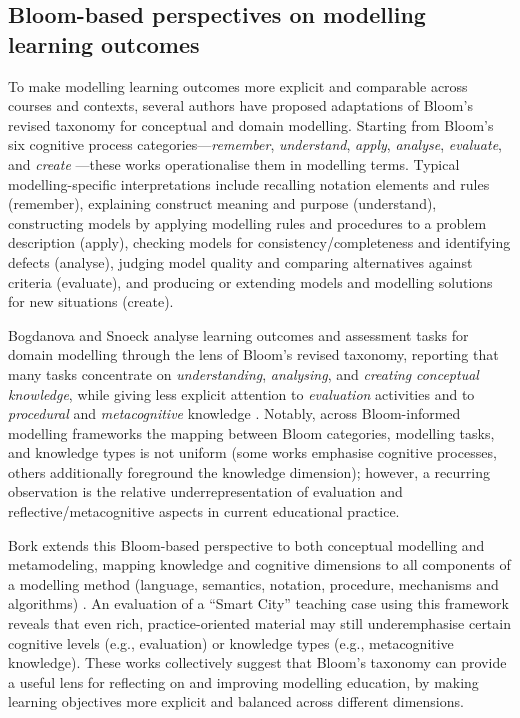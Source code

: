 \subsection{Bloom-based perspectives on modelling learning outcomes}
\label{subsec:bloom_perspectives_modelling_learning_outcomes}

To make modelling learning outcomes more explicit and comparable across courses and contexts, several authors have proposed adaptations of Bloom's revised taxonomy for conceptual and domain modelling. Starting from Bloom’s six cognitive process categories---\emph{remember}, \emph{understand}, \emph{apply}, \emph{analyse}, \emph{evaluate}, and \emph{create} \cite{krathwohl2002revision}---these works operationalise them in modelling terms. Typical modelling-specific interpretations include recalling notation elements and rules (remember), explaining construct meaning and purpose (understand), constructing models by applying modelling rules and procedures to a problem description (apply), checking models for consistency/completeness and identifying defects (analyse), judging model quality and comparing alternatives against criteria (evaluate), and producing or extending models and modelling solutions for new situations (create).

Bogdanova and Snoeck analyse learning outcomes and assessment tasks for domain modelling through the lens of Bloom's revised taxonomy, reporting that many tasks concentrate on \emph{understanding}, \emph{analysing}, and \emph{creating} \emph{conceptual knowledge}, while giving less explicit attention to \emph{evaluation} activities and to \emph{procedural} and \emph{metacognitive} knowledge \cite{bogdanova2017domain}. Notably, across Bloom-informed modelling frameworks the mapping between Bloom categories, modelling tasks, and knowledge types is not uniform (some works emphasise cognitive processes, others additionally foreground the knowledge dimension); however, a recurring observation is the relative underrepresentation of evaluation and reflective/metacognitive aspects in current educational practice.

Bork extends this Bloom-based perspective to both conceptual modelling and metamodeling, mapping knowledge and cognitive dimensions to all components of a modelling method (language, semantics, notation, procedure, mechanisms and algorithms) \cite{bork2019framework}. An evaluation of a ``Smart City'' teaching case using this framework reveals that even rich, practice-oriented material may still underemphasise certain cognitive levels (e.g., evaluation) or knowledge types (e.g., metacognitive knowledge). These works collectively suggest that Bloom's taxonomy can provide a useful lens for reflecting on and improving modelling education, by making learning objectives more explicit and balanced across different dimensions.


